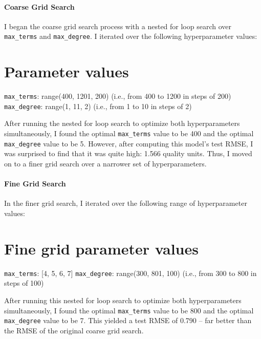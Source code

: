 \documentclass[
  letterpaper,
  DIV=11,
  numbers=noendperiod]{scrartcl}
\let\oldparagraph\paragraph
\renewcommand{\paragraph}[1]{\oldparagraph{#1}\mbox{}}
\begin{document}
\hypertarget{coarse-grid-search}{%
\paragraph{Coarse Grid Search}\label{coarse-grid-search}}

I began the coarse grid search process with a nested for loop search
over \texttt{max\_terms} and \texttt{max\_degree}. I iterated over the
following hyperparameter values:

\hypertarget{parameter-values}{%
\section{Parameter values}\label{parameter-values}}

\texttt{max\_terms}: range(400, 1201, 200) (i.e., from 400 to 1200 in
steps of 200) \texttt{max\_degree}: range(1, 11, 2) (i.e., from 1 to 10
in steps of 2)

After running the nested for loop search to optimize both
hyperparameters simultaneously, I found the optimal \texttt{max\_terms}
value to be 400 and the optimal \texttt{max\_degree} value to be 5.
However, after computing this model's test RMSE, I was surprised to find
that it was quite high: 1.566 quality units. Thus, I moved on to a finer
grid search over a narrower set of hyperparameters.

\hypertarget{fine-grid-search}{%
\paragraph{Fine Grid Search}\label{fine-grid-search}}

In the finer grid search, I iterated over the following range of
hyperparameter values:

\hypertarget{fine-grid-parameter-values}{%
\section{Fine grid parameter values}\label{fine-grid-parameter-values}}

\texttt{max\_terms}: {[}4, 5, 6, 7{]} \texttt{max\_degree}: range(300,
801, 100) (i.e., from 300 to 800 in steps of 100)

After running this nested for loop search to optimize both
hyperparameters simultaneously, I found the optimal \texttt{max\_terms}
value to be 800 and the optimal \texttt{max\_degree} value to be 7. This
yielded a test RMSE of 0.790 -- far better than the RMSE of the original
coarse grid search.
\end{document}

